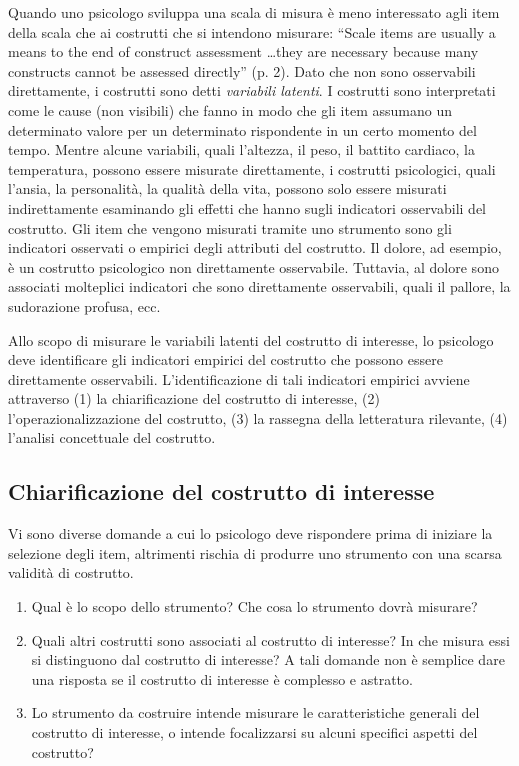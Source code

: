 Quando uno psicologo sviluppa una scala di misura è meno interessato agli item della scala che ai costrutti che si intendono misurare: ``Scale items are usually a means to the end of construct assessment \dots they are necessary because many constructs cannot be assessed directly'' (p. 2). Dato che non sono osservabili direttamente, i costrutti sono detti \emph{variabili latenti}. I costrutti sono interpretati come le cause (non visibili) che fanno in modo che gli item assumano un determinato valore per un determinato rispondente in un certo momento del tempo. Mentre alcune variabili, quali l'altezza, il peso, il battito cardiaco, la temperatura, possono essere misurate direttamente, i costrutti psicologici, quali l'ansia, la personalità, la qualità della vita, possono solo essere misurati indirettamente esaminando gli effetti che hanno sugli indicatori osservabili del costrutto. Gli item che vengono misurati tramite uno strumento sono gli indicatori osservati o empirici degli attributi del costrutto. Il dolore, ad esempio, è un costrutto psicologico non direttamente osservabile. Tuttavia, al dolore sono associati molteplici indicatori che sono direttamente osservabili, quali il pallore, la sudorazione profusa, ecc.

Allo scopo di misurare le variabili latenti del costrutto di interesse, lo psicologo deve identificare gli indicatori empirici del costrutto che possono essere direttamente osservabili. L'identificazione di tali indicatori empirici avviene attraverso (1) la chiarificazione del costrutto di interesse, (2) 	l'operazionalizzazione del costrutto, (3) la rassegna della letteratura rilevante, (4) l'analisi concettuale del costrutto.

\subsection{Chiarificazione del costrutto di interesse}

Vi sono diverse domande a cui lo psicologo deve rispondere prima di iniziare la selezione degli item, altrimenti rischia di produrre uno strumento con una scarsa validità di costrutto. 
\begin{enumerate}
\item
Qual è lo scopo dello strumento? Che cosa lo strumento dovrà misurare?
\item
Quali altri costrutti sono associati al costrutto di interesse? In che misura essi si distinguono dal costrutto di interesse? A tali domande non è semplice dare una risposta se il costrutto di interesse è complesso e astratto.
\item 
Lo strumento da costruire intende misurare le caratteristiche generali del costrutto di interesse, o intende focalizzarsi su alcuni specifici aspetti del costrutto?
\end{enumerate}

